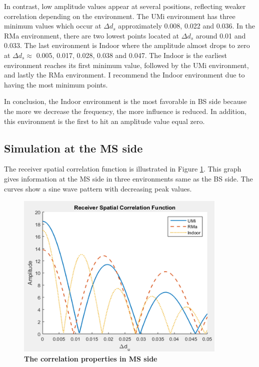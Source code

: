 \documentclass{article} %
\begin{document}
In contrast, low amplitude values appear at several positions, reflecting weaker correlation depending on the environment. The UMi environment has three minimum values which occur at $\Delta d_s$ approximately 0.008, 0.022 and 0.036. In the RMa environment, there are two lowest points located at $\Delta d_s$ around 0.01 and 0.033. The last environment is Indoor where the amplitude almost drops to zero at $\Delta d_s \approx$ 0.005, 0.017, 0.028, 0.038 and 0.047. The Indoor is the earliest environment reaches its first minimum value, followed by the UMi environment, and lastly the RMa environment. I recommend the Indoor environment due to having the most minimum points.

In conclusion, the Indoor environment is the most favorable in BS side because the more we decrease the frequency, the more influence is reduced. In addition, this environment is the first to hit an amplitude value equal zero.

\subsection{Simulation at the MS side}
The receiver spatial correlation function is illustrated in Figure \ref{figure3}. This graph gives information at the MS side in three environments same as the BS side. The curves show a sine wave pattern with decreasing peak values.

\begin{figure}[!ht]
    \centering
    \includegraphics[height=8cm]{Images/figure3.png}
    \caption[The correlation properties in MS side~\cite{final_exam}]{\bfseries \fontsize{12pt}{0pt}\selectfont The correlation properties in MS side~\cite{final_exam}}
    \label{figure3}
\end{figure}
\end{document}
